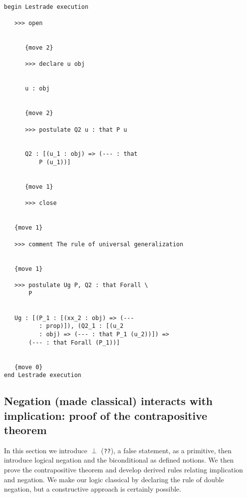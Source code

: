 \documentclass[12pt]{article}
\begin{document}
\begin{verbatim}

begin Lestrade execution

   >>> open


      {move 2}

      >>> declare u obj


      u : obj


      {move 2}

      >>> postulate Q2 u : that P u


      Q2 : [(u_1 : obj) => (--- : that 
          P (u_1))]


      {move 1}

      >>> close


   {move 1}

   >>> comment The rule of universal generalization


   {move 1}

   >>> postulate Ug P, Q2 : that Forall \
       P


   Ug : [(P_1 : [(xx_2 : obj) => (--- 
          : prop)]), (Q2_1 : [(u_2 
          : obj) => (--- : that P_1 (u_2))]) => 
       (--- : that Forall (P_1))]


   {move 0}
end Lestrade execution
\end{verbatim}

\subsection{Negation (made classical) interacts with implication:  proof of the contrapositive theorem}

In this section we introduce $\perp$ ({\tt ??}), a false statement, as a primitive, then introduce logical negation and the biconditional as defined notions.  We then prove the contrapositive theorem and develop derived rules relating implication and negation.  We make our logic classical by declaring the rule of double negation, but a constructive approach is certainly possible.
\end{document}
